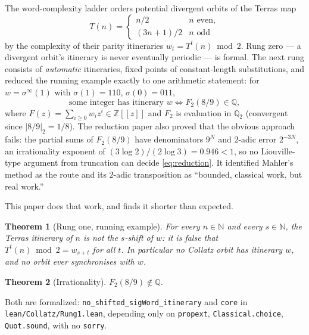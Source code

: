 \documentclass[11pt]{article}
\newtheorem{theorem}{Theorem}[section]
\theoremstyle{definition}
\newcommand{\N}{\mathbb{N}}
\newcommand{\Z}{\mathbb{Z}}
\newcommand{\Q}{\mathbb{Q}}
\newcommand{\code}[1]{\texttt{#1}}
\begin{document}
The word-complexity ladder \cite{ladder} orders potential divergent
orbits of the Terras map
\[
T(n) = \begin{cases} n/2 & n \text{ even},\\ (3n+1)/2 & n \text{ odd}\end{cases}
\]
by the complexity of their parity itineraries $w_t = T^t(n) \bmod 2$.
Rung zero --- a divergent orbit's itinerary is never eventually
periodic --- is formal. The next rung consists of \emph{automatic}
itineraries, fixed points of constant-length substitutions, and
\cite{ladder} reduced the running example exactly to one arithmetic
statement: for $w = \sigma^\infty(1)$ with $\sigma(1) = 110$,
$\sigma(0) = 011$,
\begin{equation}\label{eq:reduction}
\text{some integer has itinerary } w
\iff F_2(8/9) \in \Q,
\end{equation}
where $F(z) = \sum_{i \ge 0} w_i z^i \in \Z[[z]]$ and $F_2$ is
evaluation in $\Q_2$ (convergent since $|8/9|_2 = 1/8$). The
reduction paper also proved that the obvious approach fails: the
partial sums of $F_2(8/9)$ have denominators $9^N$ and $2$-adic error
$2^{-3N}$, an irrationality exponent of $(3\log 2)/(2 \log 3) = 0.946
< 1$, so no Liouville-type argument from truncation can decide
\eqref{eq:reduction}. It identified Mahler's method as the route and
its $2$-adic transposition as ``bounded, classical work, but real
work.''

This paper does that work, and finds it shorter than expected.

\begin{theorem}[Rung one, running example]\label{thm:main}
For every $n \in \N$ and every $s \in \N$, the Terras itinerary of $n$
is not the $s$-shift of $w$: it is false that $T^t(n) \bmod 2 =
w_{s+t}$ for all $t$. In particular no Collatz orbit has itinerary
$w$, and no orbit ever synchronises with $w$.
\end{theorem}

\begin{theorem}[Irrationality]\label{thm:irr}
$F_2(8/9) \notin \Q$.
\end{theorem}

Both are formalized: \code{no\_shifted\_sigWord\_itinerary} and
\code{core} in \code{lean/Collatz/Rung1.lean}, depending only on
\code{propext}, \code{Classical.choice}, \code{Quot.sound}, with no
\code{sorry}.
\end{document}
